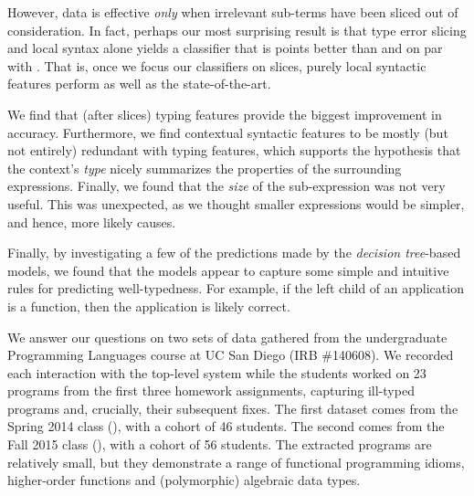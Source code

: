 {}
%
However, data is effective \emph{only}
when irrelevant sub-terms have been
sliced out of consideration.
%
In fact, perhaps our most surprising
result is that type error slicing and
local syntax alone yields
a classifier that is \SlicingWinOcaml points
better than \ocaml and on par with
\sherrloc.
%
That is, once we focus our classifiers on
slices, purely local syntactic features
perform as well as the
state-of-the-art.

{}
%
We find that (after slices)
typing features
provide the biggest
improvement in accuracy.
%
Furthermore, we find contextual syntactic
features to be mostly (but not entirely)
redundant with typing features,
which supports the hypothesis that
the context's \emph{type} nicely
summarizes the properties of the
surrounding expressions.
%
Finally, we found that the \emph{size}
of the sub-expression was not very useful.
This was unexpected, as we thought
smaller expressions would be simpler, and
hence, more likely causes.

{}
%
Finally, by investigating a few of the
predictions made by the \emph{decision tree}-based
models, we found that the models
appear to capture some simple and intuitive
rules for predicting well-typedness.
%
For example, if the left child of an application
is a function, then the application is likely
correct.

%


\label{sec:nate:methodology}

We answer our questions on two sets of data gathered from the
undergraduate Programming Languages course at
UC San Diego (IRB \#140608).
%
We recorded each interaction with the \ocaml top-level system while the
students worked on 23 programs from the first three homework
assignments, capturing ill-typed programs and, crucially, their
subsequent fixes.
%
The first dataset comes from the Spring 2014 class (\SPRING), with a
cohort of 46 students. The second comes from the Fall 2015 class
(\FALL), with a cohort of 56 students.
%
The extracted programs are relatively small, but they demonstrate a
range of functional programming idioms, \eg higher-order functions and
(polymorphic) algebraic data types.

